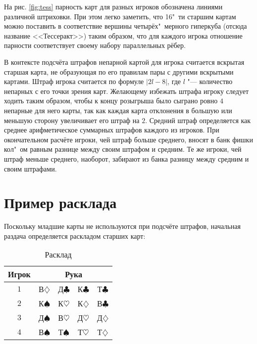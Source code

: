 На рис. \ref{fig:tess} парность карт для разных игроков обозначена линиями различной штриховки. При этом легко заметить, что 16"~ти старшим картам можно поставить в соответствие вершины четырёх"~мерного гиперкуба (отсюда название <<Тессеракт>>) таким образом, что для каждого игрока отношение парности соответствует своему набору параллельных рёбер.

В контексте подсчёта штрафов непарной картой для игрока считается вскрытая старшая карта, не образующая по его правилам пары с другими вскрытыми картами. Штраф игрока считается по формуле $\left|2l-8\right|$, где $l$ "--- количество непарных с его точки зрения карт. Желающему избежать штрафа игроку следует ходить таким образом, чтобы к концу розыгрыша было сыграно ровно $4$ непарные для него карты, так как каждая карта отклонения в большую или меньшую сторону увеличивает его штраф на $2$. Средний штраф определяется как среднее арифметическое суммарных штрафов каждого из игроков. При окончательном расчёте игроки, чей штраф больше среднего, вносят в банк фишки кол"~ом равным разнице между своим штрафом и средним. Те же игроки, чей штраф меньше среднего, наоборот, забирают из банка разницу между средним и своим штрафами.

\section{Пример расклада}\label{app:D2}

Поскольку младшие карты не используются при подсчёте штрафов, начальная раздача определяется раскладом старших карт:

\begin{table}[htbp]
	\centering
	\caption{Расклад}
	\label{tab:cards1}
	\begin{SingleSpace}
		\begin{tabular}{|c|cccc|}
			\hline
			Игрок & \multicolumn{4}{c|}{Рука} \\
			\hline
			$1$ & В$\diamondsuit$ & Д$\clubsuit$ & К$\clubsuit$ & Т$\clubsuit$ \\
			$2$ & К$\spadesuit$ & К$\heartsuit$ & К$\diamondsuit$ & В$\clubsuit$ \\
			$3$ & Д$\spadesuit$ & В$\heartsuit$ & Д$\heartsuit$ & Д$\diamondsuit$ \\
			$4$ & В$\spadesuit$ & Т$\spadesuit$ & Т$\heartsuit$ & Т$\diamondsuit$ \\
			\hline
		\end{tabular}
	\end{SingleSpace}
\end{table}

